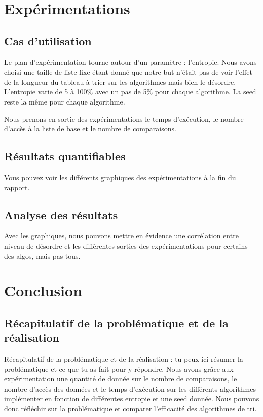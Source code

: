 \documentclass[10pt,a4paper]{article}
\begin{document}
\section{Expérimentations}
    \subsection{Cas d’utilisation}

    Le plan d'expérimentation tourne autour d'un paramètre : l'entropie. Nous avons choisi une taille de liste fixe étant donné que notre but n'était pas de voir l'effet de la longueur du tableau à trier sur les algorithmes mais bien le désordre.\\

    L'entropie varie de 5 à 100\% avec un pas de 5\% pour chaque algorithme. La seed reste la même pour chaque algorithme.

    Nous prenons en sortie des expérimentations le temps d'exécution, le nombre d'accès à la liste de base et le nombre de comparaisons.
    
    \subsection{Résultats quantifiables}

    Vous pouvez voir les différents graphiques des expérimentations à la fin du rapport.
    
    \subsection{Analyse des résultats}
     Avec les graphiques, nous pouvons mettre en évidence une corrélation entre niveau de désordre et les différentes sorties des expérimentations pour certains des algos, mais pas tous.
     
\section{Conclusion}
    \subsection{Récapitulatif de la problématique et de la réalisation}
    Récapitulatif de la problématique et de la réalisation : tu peux ici résumer la problématique et ce que tu as fait pour y répondre.
    Nous avons grâce aux expérimentation une quantité de donnée sur le nombre de comparaisons, le nombre d'accès des données et le temps d'exécution sur les différents algorithmes implémenter en fonction de différentes entropie et une seed donnée. Nous pouvons donc réfléchir sur la problématique et comparer l'efficacité des algorithmes de tri.
 
\end{document}
